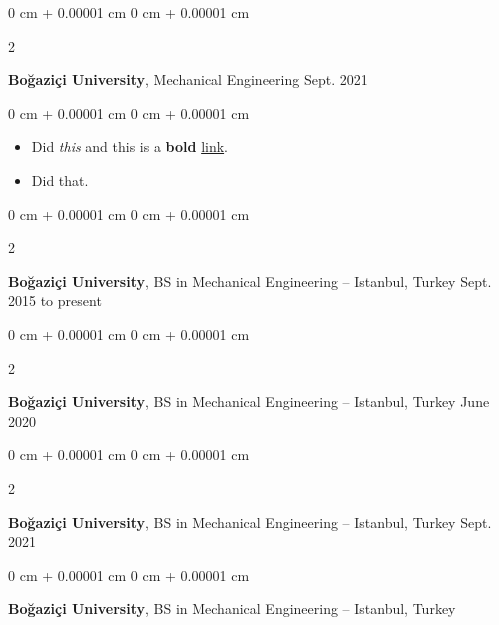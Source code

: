 \documentclass[10pt, letterpaper]{article}
\newenvironment{highlights}{
    \begin{itemize}[
        topsep=0.10 cm,
        parsep=0.10 cm,
        partopsep=0pt,
        itemsep=0pt,
        leftmargin=0 cm + 10pt
    ]
}{
    \end{itemize}
} %
\newenvironment{onecolentry}{
    \begin{adjustwidth}{
        0 cm + 0.00001 cm
    }{
        0 cm + 0.00001 cm
    }
}{
    \end{adjustwidth}
} %
\newenvironment{twocolentry}[2][]{
    \onecolentry
    \def\secondColumn{#2}
    \setcolumnwidth{\fill, 4.5 cm}
    \begin{paracol}{2}
}{
    \switchcolumn \raggedleft \secondColumn
    \end{paracol}
    \endonecolentry
} %
\begin{document}
        \vspace{0.2 cm}

        \begin{twocolentry}{
            Sept. 2021
        }
            \textbf{Boğaziçi University}, Mechanical Engineering\end{twocolentry}

        \vspace{0.10 cm}
        \begin{onecolentry}
            \begin{highlights}
                \item Did \textit{this} and this is a \textbf{bold} \href{https://example.com}{link}.
                \item Did that.
            \end{highlights}
        \end{onecolentry}


        \vspace{0.2 cm}

        \begin{twocolentry}{
            Sept. 2015 to present
        }
            \textbf{Boğaziçi University}, BS in Mechanical Engineering -- Istanbul, Turkey\end{twocolentry}



        \vspace{0.2 cm}

        \begin{twocolentry}{
            June 2020
        }
            \textbf{Boğaziçi University}, BS in Mechanical Engineering -- Istanbul, Turkey\end{twocolentry}



        \vspace{0.2 cm}

        \begin{twocolentry}{
            Sept. 2021
        }
            \textbf{Boğaziçi University}, BS in Mechanical Engineering -- Istanbul, Turkey\end{twocolentry}



        \vspace{0.2 cm}

        \begin{onecolentry}
            \textbf{Boğaziçi University}, BS in Mechanical Engineering -- Istanbul, Turkey\end{onecolentry}
\end{document}
